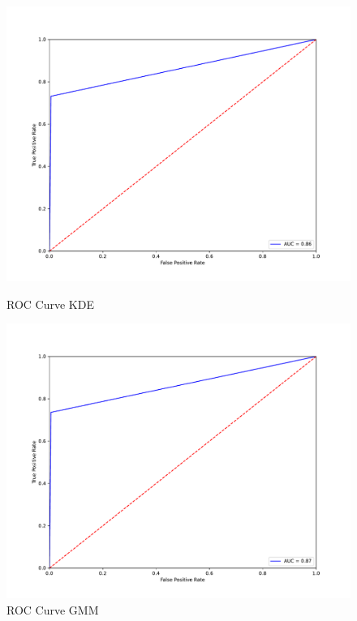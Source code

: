 \begin{figure}[!htb] %
    \begin{minipage}[t]{0.5\textwidth}
        \vspace{0pt}
        \includegraphics[width=\textwidth]{images/kde-roc.pdf}
        \caption{ROC Curve KDE} 
    \end{minipage}
    \hfill
    \begin{minipage}[t]{0.5\textwidth}
        \vspace{0pt}
        \includegraphics[width=\textwidth]{images/gmm-roc.pdf}
        \caption{ROC Curve GMM}
    \end{minipage}
    

\end{figure}
